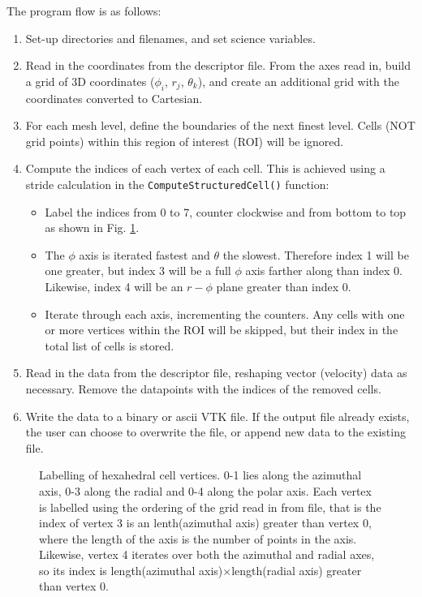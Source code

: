 \documentclass[preprint2]{aastex62}
\begin{document}
The program flow is as follows:
\begin{enumerate}
	\item Set-up directories and filenames, and set science variables.
	\item Read in the coordinates from the descriptor file. From the axes read in, build a grid of 3D coordinates ($\phi_{i}$, $r_{j}$, $\theta_{k}$), and create an additional grid with the coordinates converted to Cartesian. 
	\item For each mesh level, define the boundaries of the next finest level. Cells (NOT grid points) within this region of interest (ROI) will be ignored.
	\item Compute the indices of each vertex of each cell. This is achieved using a stride calculation in the \verb|ComputeStructuredCell()| function:	
	\begin{itemize}
		 \item Label the indices from 0 to 7, counter clockwise and from bottom to top as shown in Fig. \ref{fig:cube}.
		 \item The $\phi$ axis is iterated fastest and $\theta$ the slowest. Therefore index 1 will be one greater, but index 3 will be a full $\phi$ axis farther along than index 0. Likewise, index 4 will be an $r-\phi$ plane greater than index 0.
		 \item Iterate through each axis, incrementing the counters. Any cells with one or more vertices within the ROI will be skipped, but their index in the total list of cells is stored.
 	\end{itemize}
	\item Read in the data from the descriptor file, reshaping vector (velocity) data as necessary. Remove the datapoints with the indices of the removed cells.
	\item Write the data to a binary or ascii VTK file. If the output file already exists, the user can choose to overwrite the file, or append new data to the existing file.
\end{enumerate}
\begin{figure}[t]
	\centering
{}
\caption{\label{fig:cube} Labelling of hexahedral cell vertices. 0-1 lies along the azimuthal axis, 0-3 along the radial and 0-4 along the polar axis. Each vertex is labelled using the ordering of the grid read in from file, that is the index of vertex 3 is an lenth(azimuthal axis) greater than vertex 0, where the length of the axis is the number of points in the axis. Likewise, vertex 4 iterates over both the azimuthal and radial axes, so its index is length(azimuthal axis)$\times$length(radial axis) greater than vertex 0.}
\end{figure}
\end{document}
